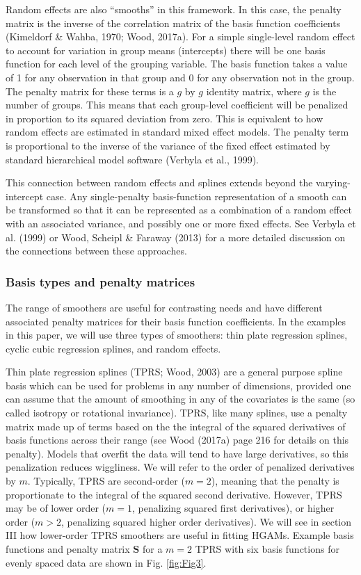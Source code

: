 \documentclass[12pt]{article}
\begin{document}
Random effects are also ``smooths'' in this framework. In this case, the
penalty matrix is the inverse of the correlation matrix of the basis
function coefficients (Kimeldorf \& Wahba, 1970; Wood, 2017a). For a
simple single-level random effect to account for variation in group
means (intercepts) there will be one basis function for each level of
the grouping variable. The basis function takes a value of 1 for any
observation in that group and 0 for any observation not in the group.
The penalty matrix for these terms is a \(g\) by \(g\) identity matrix,
where \(g\) is the number of groups. This means that each group-level
coefficient will be penalized in proportion to its squared deviation
from zero. This is equivalent to how random effects are estimated in
standard mixed effect models. The penalty term is proportional to the
inverse of the variance of the fixed effect estimated by standard
hierarchical model software (Verbyla et al., 1999).

This connection between random effects and splines extends beyond the
varying-intercept case. Any single-penalty basis-function representation
of a smooth can be transformed so that it can be represented as a
combination of a random effect with an associated variance, and possibly
one or more fixed effects. See Verbyla et al. (1999) or Wood, Scheipl \&
Faraway (2013) for a more detailed discussion on the connections between
these approaches.

\subsubsection{Basis types and penalty
matrices}\label{basis-types-and-penalty-matrices}

The range of smoothers are useful for contrasting needs and have
different associated penalty matrices for their basis function
coefficients. In the examples in this paper, we will use three types of
smoothers: thin plate regression splines, cyclic cubic regression
splines, and random effects.

Thin plate regression splines (TPRS; Wood, 2003) are a general purpose
spline basis which can be used for problems in any number of dimensions,
provided one can assume that the amount of smoothing in any of the
covariates is the same (so called isotropy or rotational invariance).
TPRS, like many splines, use a penalty matrix made up of terms based on
the the integral of the squared derivatives of basis functions across
their range (see Wood (2017a) page 216 for details on this penalty).
Models that overfit the data will tend to have large derivatives, so
this penalization reduces wiggliness. We will refer to the order of
penalized derivatives by \(m\). Typically, TPRS are second-order
(\(m=2\)), meaning that the penalty is proportionate to the integral of
the squared second derivative. However, TPRS may be of lower order
(\(m=1\), penalizing squared first derivatives), or higher order
(\(m > 2\), penalizing squared higher order derivatives). We will see in
section III how lower-order TPRS smoothers are useful in fitting HGAMs.
Example basis functions and penalty matrix \(\mathbf{S}\) for a \(m=2\)
TPRS with six basis functions for evenly spaced data are shown in Fig.
\ref{fig:Fig3}.
\end{document}
